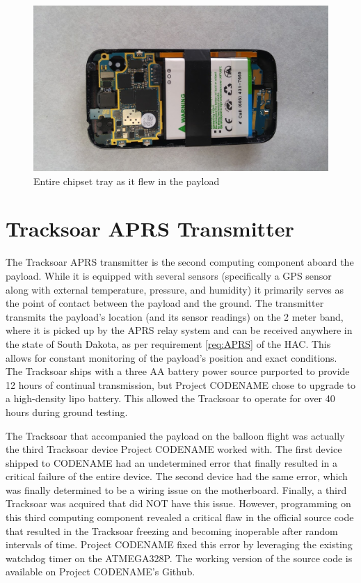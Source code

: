 \documentclass[english]{report}
\begin{document}
\begin{figure}[H]
\begin{centering}
\includegraphics[scale=0.2]{./images/tray}
\par\end{centering}
\label{tray}
\caption{Entire chipset tray as it flew in the payload}
\end{figure}



\section{Tracksoar APRS Transmitter}

The Tracksoar APRS transmitter is the second computing component aboard the payload. While it is equipped with several sensors (specifically a GPS sensor along with external temperature, pressure, and humidity) it primarily serves as the point of contact between the payload and the ground. The transmitter transmits the payload's location (and its sensor readings) on the 2 meter band, where it is picked up by the APRS relay system and can be received anywhere in the state of South Dakota, as per requirement \ref{req:APRS} of the HAC. This allows for constant monitoring of the payload's position and exact conditions. The Tracksoar ships with a three AA battery power source purported to provide 12 hours of continual transmission, but Project CODENAME chose to upgrade to a high-density lipo battery.  This allowed the Tracksoar to operate for over 40 hours during ground testing.

The Tracksoar that accompanied the payload on the balloon flight was actually the third Tracksoar device Project CODENAME worked with.  The first device shipped to CODENAME had an undetermined error that finally resulted in a critical failure of the entire device.  The second device had the same error, which was finally determined to be a wiring issue on the motherboard.  Finally, a third Tracksoar was acquired that did NOT have this issue.  However, programming on this third computing component revealed a critical flaw in the official source code that resulted in the Tracksoar freezing and becoming inoperable after random intervals of time.  Project CODENAME fixed this error by leveraging the existing watchdog timer on the ATMEGA328P.  The working version of the source code is available on Project CODENAME's Github.
\end{document}
